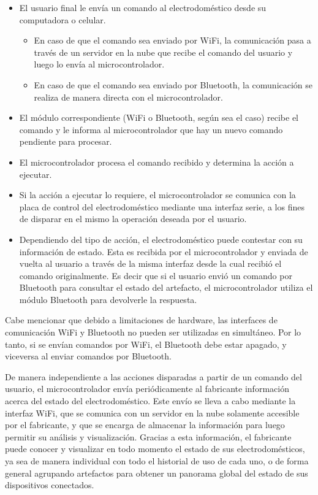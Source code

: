 \begin{itemize}
	\item El usuario final le envía un comando al electrodoméstico desde su computadora o celular.
	\begin{itemize}
		\item En caso de que el comando sea enviado por WiFi, la comunicación pasa a través de un servidor en la nube que recibe el comando del usuario y luego lo envía al microcontrolador.
		\item En caso de que el comando sea enviado por Bluetooth, la comunicación se realiza de manera directa con el microcontrolador.
	\end{itemize}
	\item El módulo correspondiente (WiFi o Bluetooth, según sea el caso) recibe el comando y le informa al microcontrolador que hay un nuevo comando pendiente para procesar.
	\item El microcontrolador procesa el comando recibido y determina la acción a ejecutar.
	\item Si la acción a ejecutar lo requiere, el microcontrolador se comunica con la placa de control del electrodoméstico mediante una interfaz serie, a los fines de disparar en el mismo la operación deseada por el usuario.
	\item Dependiendo del tipo de acción, el electrodoméstico puede contestar con su información de estado. Esta es recibida por el microcontrolador y enviada de vuelta al usuario a través de la misma interfaz desde la cual recibió el comando originalmente. Es decir que si el usuario envió un comando por Bluetooth para consultar el estado del artefacto, el microcontrolador utiliza el módulo Bluetooth para devolverle la respuesta.
\end{itemize}

Cabe mencionar que debido a limitaciones de hardware, las interfaces de comunicación WiFi y Bluetooth no pueden ser utilizadas en simultáneo. Por lo tanto, si se envían comandos por WiFi, el Bluetooth debe estar apagado, y viceversa al enviar comandos por Bluetooth. 

De manera independiente a las acciones disparadas a partir de un comando del usuario, el microcontrolador envía periódicamente al fabricante información acerca del estado del electrodoméstico. Este envío se lleva a cabo mediante la interfaz WiFi, que se comunica con un servidor en la nube solamente accesible por el fabricante, y que se encarga de almacenar la información para luego permitir su análisis y visualización. Gracias a esta información, el fabricante puede conocer y visualizar en todo momento el estado de sus electrodomésticos, ya sea de manera individual con todo el historial de uso de cada uno, o de forma general agrupando artefactos para obtener un panorama global del estado de sus dispositivos conectados.


